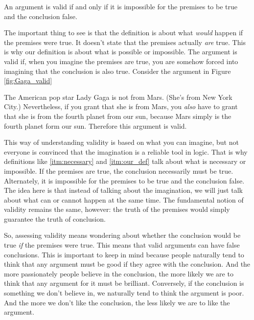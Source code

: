   An argument is valid if and only if it is impossible for the premises to be true and the conclusion false.

The important thing to see is that the definition is about what \textit{would} happen if the premises were true. It doesn't state that the premises actually \textit{are} true. This is why our definition is about what is possible or impossible. The argument is valid if, when you imagine the premises are true, you are somehow forced into imagining that the conclusion is also true. Consider the argument in Figure \ref{fig:Gaga_valid}


\begin{kormanize}
\end{kormanize}

The American pop star Lady Gaga is not from Mars. (She's from New York City.) Nevertheless, if you grant that she is from Mars, you \emph{also} have to grant that she is from the fourth planet from our sun, because Mars simply is the fourth planet form our sun. Therefore this argument is valid.

This way of understanding validity is based on what you can imagine, but not everyone is convinced that the imagination is a reliable tool in logic. That is why definitions like \ref{itm:necessary} and \ref{itm:our_def} talk about what is necessary or impossible. If the premises are true, the conclusion necessarily must be true. Alternately, it is impossible for the premises to be true and the conclusion false. The idea here is that instead of talking about the imagination, we will just talk about what can or cannot happen at the same time. The fundamental notion of validity remains the same, however: the truth of the premises would simply guarantee the truth of conclusion.

So, assessing validity means wondering about whether the conclusion would be true \textit{if} the premises were true. This means that valid arguments can have false conclusions. This is important to keep in mind because people naturally tend to think that any argument must be good if they agree with the conclusion. And the more passionately people believe in the conclusion, the more likely we are to think that any argument for it must be brilliant. Conversely, if the conclusion is something we don't believe in, we naturally tend to think the argument is poor. And the more we don't like the conclusion, the less likely we are to like the argument.



